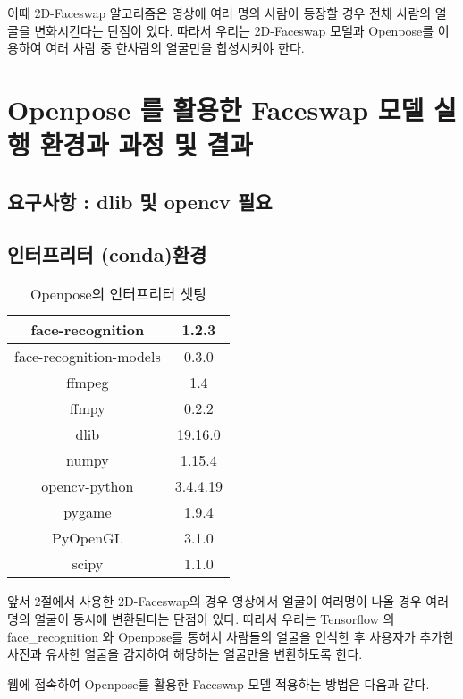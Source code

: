 \documentclass{oblivoir}
\begin{document}
이때 2D-Faceswap 알고리즘은 영상에 여러 명의 사람이 등장할 경우 전체 사람의 얼굴을 변화시킨다는 단점이 있다. 따라서 우리는 2D-Faceswap 모델과 Openpose를 이용하여 여러 사람 중 한사람의 얼굴만을 합성시켜야 한다.
	
 

 \section{ Openpose 를 활용한 Faceswap 모델 실행 환경과 과정 및 결과}

 \subsection{요구사항 :  dlib 및 opencv 필요}

 \subsection{인터프리터 (conda)환경}

 \begin{table}[h!]
    \centering
        \begin{tabular}{|c|c|}
            \hline\hline
            face-recognition & 1.2.3\\ \hline
            face-recognition-models & 0.3.0 \\ \hline
            ffmpeg & 1.4 \\ \hline
            ffmpy & 0.2.2 \\ \hline
            dlib & 19.16.0 \\ \hline
            numpy & 1.15.4 \\ \hline
            opencv-python & 3.4.4.19\\ \hline
            pygame & 1.9.4 \\ \hline
            PyOpenGL & 3.1.0 \\ \hline
            scipy &1.1.0\\ \hline
            \hline\hline
        \end{tabular}
	\caption{Openpose의 인터프리터 셋팅 }
\end{table}

앞서 2절에서 사용한 2D-Faceswap의 경우 영상에서 얼굴이 여러명이 나올 경우 여러명의 얼굴이 동시에 변환된다는 단점이 있다. 따라서 우리는 Tensorflow 의 face_recognition 와 Openpose를 통해서 사람들의 얼굴을 인식한 후 사용자가 추가한 사진과 유사한 얼굴을 감지하여 해당하는 얼굴만을 변환하도록 한다.

웹에 접속하여 Openpose를 활용한 Faceswap 모델 적용하는 방법은 다음과 같다.
\end{document}
